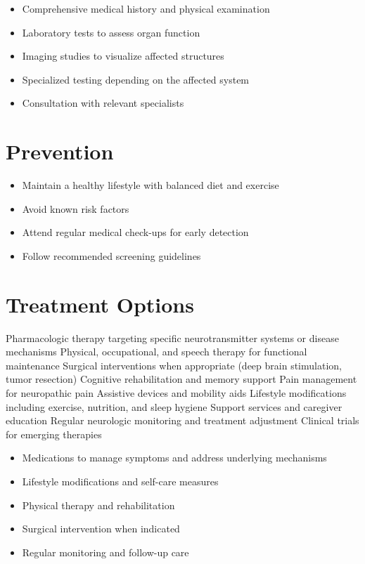 \begin{itemize}[noitemsep]
  \item Comprehensive medical history and physical examination
  \item Laboratory tests to assess organ function
  \item Imaging studies to visualize affected structures
  \item Specialized testing depending on the affected system
  \item Consultation with relevant specialists
\end{itemize}
\section{Prevention}
\begin{itemize}[noitemsep]
  \item Maintain a healthy lifestyle with balanced diet and exercise
  \item Avoid known risk factors
  \item Attend regular medical check-ups for early detection
  \item Follow recommended screening guidelines
\end{itemize}
\section{Treatment Options}
Pharmacologic therapy targeting specific neurotransmitter systems or disease mechanisms Physical, occupational, and speech therapy for functional maintenance Surgical interventions when appropriate (deep brain stimulation, tumor resection) Cognitive rehabilitation and memory support Pain management for neuropathic pain Assistive devices and mobility aids Lifestyle modifications including exercise, nutrition, and sleep hygiene Support services and caregiver education Regular neurologic monitoring and treatment adjustment Clinical trials for emerging therapies

\begin{itemize}[noitemsep]
  \item Medications to manage symptoms and address underlying mechanisms
  \item Lifestyle modifications and self-care measures
  \item Physical therapy and rehabilitation
  \item Surgical intervention when indicated
  \item Regular monitoring and follow-up care
\end{itemize}
